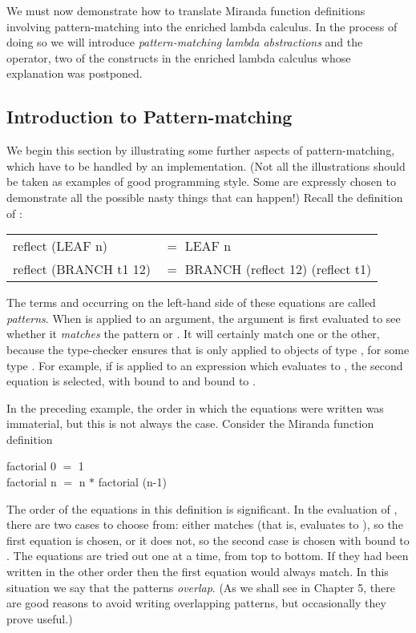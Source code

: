 We must now demonstrate how to translate Miranda function definitions involving pattern-matching into the enriched lambda calculus. In the process of doing so we will introduce \textit{pattern-matching lambda abstractions} and the \fatbar operator, two of the constructs in the enriched lambda calculus whose explanation was postponed.

\subsection{Introduction to Pattern-matching}
We begin this section by illustrating some further aspects of pattern-matching, which have to be handled by an implementation. (Not all the illustrations should be taken as examples of good programming style. Some are expressly chosen to demonstrate all the possible nasty things that can happen!)  Recall the definition of :
\begin{mlcoded}
    \begin{tabular}{ll}
    reflect (LEAF n) &$=$ LEAF n\\
    reflect (BRANCH t1 12) &$=$ BRANCH (reflect 12) (reflect t1)
    \end{tabular}
\end{mlcoded}

The terms  and  occurring on the left-hand side of these equations are called \textit{patterns}. When  is applied to an argument, the argument is first evaluated to see whether it \textit{matches} the pattern  or . It will certainly match one or the other, because the type-checker ensures that  is only applied to objects of type , for some type \ml{$*$}. For example, if  is applied to an expression which evaluates to , the second equation is selected, with  bound to  and  bound to .

In the preceding example, the order in which the equations were written was immaterial, but this is not always the case. Consider the Miranda function definition
\begin{mlcoded}
    factorial 0 $=$ 1\\
    factorial n $=$ n $*$ factorial (n-1)
\end{mlcoded}

The order of the equations in this definition is significant. In the evaluation of , there are two cases to choose from: either  matches  (that is,  evaluates to ), so the first equation is chosen, or it does not, so the second case is chosen with  bound to . The equations are tried out one at a time, from top to bottom. If they had been written in the other order then the first equation would always match. In this situation we say that the patterns \textit{overlap}. (As we shall see in Chapter 5, there are good reasons to avoid writing overlapping patterns, but occasionally they prove useful.)

